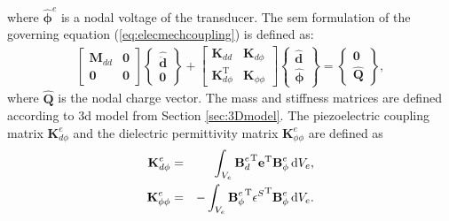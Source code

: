 where \(\widehat{\boldsymbol{\phi}}^e\) is a nodal voltage of the transducer. The \ac{sem} formulation of the governing equation (\ref{eq:elecmechcoupling}) is defined as:
\begin{eqnarray}
	\left [\begin{array}{cc}
		\textbf{M}_{dd} & \textbf{0}\\
		\textbf{0} & \textbf{0}
	\end{array}\right]
	\left \{\begin{array}{c}
		\widehat{\ddot{\textbf{d}}} \\
		\textbf{0}
	\end{array}\right \} +
	\left [\begin{array}{cc}
		\textbf{K}_{dd} & \textbf{K}_{d \phi}\\
		\textbf{K}_{d \phi}^{\mathrm{T}} & \textbf{K}_{\phi \phi}
	\end{array}\right]
	\left \{\begin{array}{c}
		\widehat{\textbf{d}} \\
		\widehat{\boldsymbol{\phi}}
	\end{array}\right \}  = 
	\left \{\begin{array}{c}
		\textbf{0}\\
		\widehat{\textbf{Q}}
	\end{array}\right \},
	\label{eq:pzt_sem}
\end{eqnarray}
%
where \(\widehat{\textbf{Q}}\) is the nodal charge vector.
The mass and stiffness matrices are defined according to \ac{3d} model from Section \ref{sec:3Dmodel}.
The piezoelectric coupling matrix \(\textbf{K}_{d \phi}^e\) and the dielectric permittivity matrix \(\textbf{K}_{\phi \phi}^e\) are defined as
\begin{eqnarray}
	\textbf{K}_{d\phi}^e & = & \int_{V_e}{\textbf{B}_d^e}^{\mathrm{T}}\textbf{e}^{\mathrm{T}} \textbf{B}_{\phi}^e \mathop{}\!\mathrm{d} V_e,\\
	\textbf{K}_{\phi \phi}^e & = & -\int_{V_e}{\textbf{B}_{\phi}^e}^{\mathrm{T}} 
	{\textbf{\(\epsilon\)}^S}^{\mathrm{T}} \textbf{B}_{\phi}^e \mathop{}\!\mathrm{d} V_e.
\end{eqnarray}

